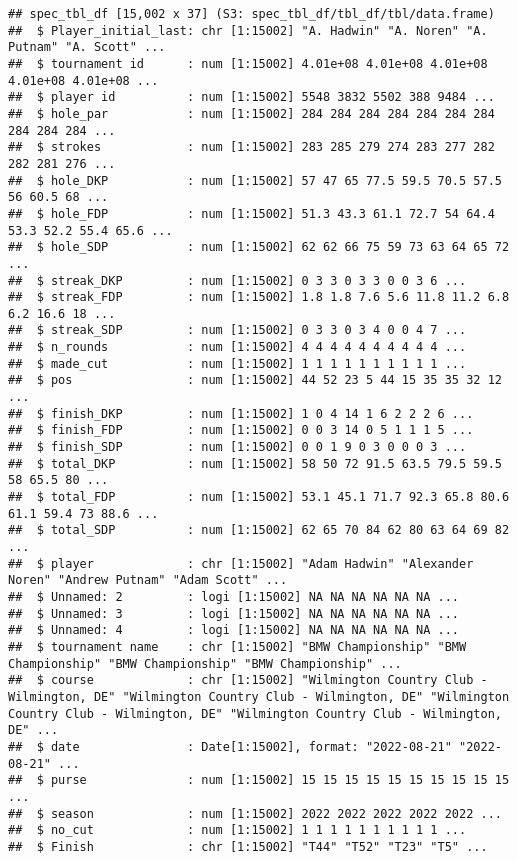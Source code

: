 \documentclass[
]{article}
\begin{document}
\begin{verbatim}
## spec_tbl_df [15,002 x 37] (S3: spec_tbl_df/tbl_df/tbl/data.frame)
##  $ Player_initial_last: chr [1:15002] "A. Hadwin" "A. Noren" "A. Putnam" "A. Scott" ...
##  $ tournament id      : num [1:15002] 4.01e+08 4.01e+08 4.01e+08 4.01e+08 4.01e+08 ...
##  $ player id          : num [1:15002] 5548 3832 5502 388 9484 ...
##  $ hole_par           : num [1:15002] 284 284 284 284 284 284 284 284 284 284 ...
##  $ strokes            : num [1:15002] 283 285 279 274 283 277 282 282 281 276 ...
##  $ hole_DKP           : num [1:15002] 57 47 65 77.5 59.5 70.5 57.5 56 60.5 68 ...
##  $ hole_FDP           : num [1:15002] 51.3 43.3 61.1 72.7 54 64.4 53.3 52.2 55.4 65.6 ...
##  $ hole_SDP           : num [1:15002] 62 62 66 75 59 73 63 64 65 72 ...
##  $ streak_DKP         : num [1:15002] 0 3 3 0 3 3 0 0 3 6 ...
##  $ streak_FDP         : num [1:15002] 1.8 1.8 7.6 5.6 11.8 11.2 6.8 6.2 16.6 18 ...
##  $ streak_SDP         : num [1:15002] 0 3 3 0 3 4 0 0 4 7 ...
##  $ n_rounds           : num [1:15002] 4 4 4 4 4 4 4 4 4 4 ...
##  $ made_cut           : num [1:15002] 1 1 1 1 1 1 1 1 1 1 ...
##  $ pos                : num [1:15002] 44 52 23 5 44 15 35 35 32 12 ...
##  $ finish_DKP         : num [1:15002] 1 0 4 14 1 6 2 2 2 6 ...
##  $ finish_FDP         : num [1:15002] 0 0 3 14 0 5 1 1 1 5 ...
##  $ finish_SDP         : num [1:15002] 0 0 1 9 0 3 0 0 0 3 ...
##  $ total_DKP          : num [1:15002] 58 50 72 91.5 63.5 79.5 59.5 58 65.5 80 ...
##  $ total_FDP          : num [1:15002] 53.1 45.1 71.7 92.3 65.8 80.6 61.1 59.4 73 88.6 ...
##  $ total_SDP          : num [1:15002] 62 65 70 84 62 80 63 64 69 82 ...
##  $ player             : chr [1:15002] "Adam Hadwin" "Alexander Noren" "Andrew Putnam" "Adam Scott" ...
##  $ Unnamed: 2         : logi [1:15002] NA NA NA NA NA NA ...
##  $ Unnamed: 3         : logi [1:15002] NA NA NA NA NA NA ...
##  $ Unnamed: 4         : logi [1:15002] NA NA NA NA NA NA ...
##  $ tournament name    : chr [1:15002] "BMW Championship" "BMW Championship" "BMW Championship" "BMW Championship" ...
##  $ course             : chr [1:15002] "Wilmington Country Club - Wilmington, DE" "Wilmington Country Club - Wilmington, DE" "Wilmington Country Club - Wilmington, DE" "Wilmington Country Club - Wilmington, DE" ...
##  $ date               : Date[1:15002], format: "2022-08-21" "2022-08-21" ...
##  $ purse              : num [1:15002] 15 15 15 15 15 15 15 15 15 15 ...
##  $ season             : num [1:15002] 2022 2022 2022 2022 2022 ...
##  $ no_cut             : num [1:15002] 1 1 1 1 1 1 1 1 1 1 ...
##  $ Finish             : chr [1:15002] "T44" "T52" "T23" "T5" ...

\end{verbatim}
\end{document}
